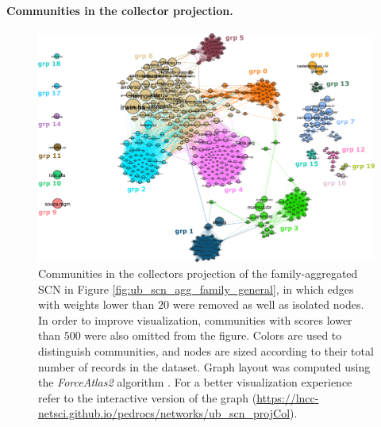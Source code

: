 \paragraph{Communities in the collector projection.}
\begin{figure}[!ht]
  	\centering
    \includegraphics[width=\linewidth]{figures/casestudy_ub/scn_family_projCol_communities.pdf}
    \caption[Communities in the collector projection of the family-aggregated SCN.]{ Communities in the collectors projection of the family-aggregated SCN in Figure \ref{fig:ub_scn_agg_family_general}, in which edges with weights lower than $20$ were removed as well as isolated nodes. In order to improve visualization, communities with scores lower than $500$ were also omitted from the figure. Colors are used to distinguish communities, and nodes are sized according to their total number of records in the dataset.
    Graph layout was computed using the \textit{ForceAtlas2} algorithm \cite{Jacomy2014}. For a better visualization experience refer to the interactive version of the graph (\url{https://lncc-netsci.github.io/pedrocs/networks/ub_scn_projCol}).}
    \label{fig:ub_scn_family_projCol_communities}
\end{figure}


